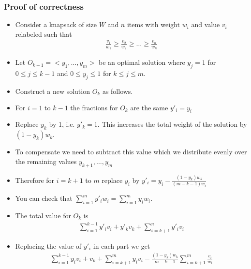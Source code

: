 \documentclass{beamer}
\begin{document}
\begin{frame}
  \frametitle{Proof of correctness}
  \begin{itemize}
  \item Consider a knapsack of size $W$ and  $n$ items with weight $w_i$ and value $v_i$ relabeled such that 
    \begin{align*}
\frac{v_1}{w_1}\ge\frac{v_2}{w_2}\ge\ldots\ge \frac{v_n}{w_n}
    \end{align*}

  \item Let $O_{k-1}=<y_1,\ldots,y_m>$ be an optimal solution where $y_j=1$ for $0\le j\le k-1$ and $0\le y_j\le 1$ for $k\le j\le m $.
\item  Construct a new solution $O_k$ as follows.
\item For $i=1$ to $k-1$ the fractions for $O_k$ are the same $y'_i=y_i$
  \item Replace $y_k$ by 1, i.e. $y'_k=1$. This increases the total weight of the solution by $(1-y_k)w_k$.
  \item To compensate we need to subtract this value which we distribute evenly over the remaining values $y_{k+1},\ldots,y_m$
  \item Therefore for $i=k+1$ to $m$ replace $y_i$ by $y'_i=y_i-\frac{(1-y_k)w_k}{(m-k-1)w_i}$
  \item You can check that $\sum_{i=1}^my'_iw_i=\sum_{i=1}^my_iw_i$.
  \end{itemize}
\end{frame}
\begin{frame}
  \begin{itemize}
  \item The total value for $O_k$ is
    \begin{align*}
      \sum_{i=1}^{k-1}y'_iv_i+y'_kv_k+\sum_{i=k+1}^ny'_iv_i
    \end{align*}
\item Replacing the value of $y'_i$ in each part we get
  \begin{align*}
    \sum_{i=1}^{k-1}y_iv_i+v_k+\sum_{i=k+1}^my_iv_i-\frac{(1-y_k)w_k}{m-k-1}\sum_{i=k+1}^{m}\frac{v_i}{w_i}
  \end{align*}

  \end{itemize}
\end{frame}
\end{document}
